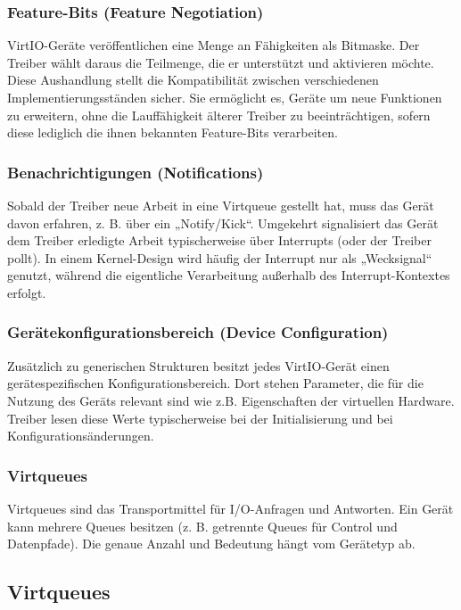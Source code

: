 \subsubsection{Feature-Bits (Feature Negotiation)}
VirtIO-Geräte veröffentlichen eine Menge an Fähigkeiten als Bitmaske. Der Treiber wählt daraus die Teilmenge, die er unterstützt und aktivieren möchte. Diese Aushandlung stellt die Kompatibilität zwischen verschiedenen Implementierungsständen sicher. Sie ermöglicht es, Geräte um neue Funktionen zu erweitern, ohne die Lauffähigkeit älterer Treiber zu beeinträchtigen, sofern diese lediglich die ihnen bekannten Feature-Bits verarbeiten.

\subsubsection{Benachrichtigungen (Notifications)}
Sobald der Treiber neue Arbeit in eine Virtqueue gestellt hat, muss das Gerät davon erfahren, z. B. über ein „Notify/Kick“. Umgekehrt signalisiert das Gerät dem Treiber erledigte Arbeit typischerweise über Interrupts (oder der Treiber pollt). In einem Kernel-Design wird häufig der Interrupt nur als „Wecksignal“ genutzt, während die eigentliche Verarbeitung außerhalb des Interrupt-Kontextes erfolgt.

\subsubsection{Gerätekonfigurationsbereich (Device Configuration)}
Zusätzlich zu generischen Strukturen besitzt jedes VirtIO-Gerät einen gerätespezifischen Konfigurationsbereich. Dort stehen Parameter, die für die Nutzung des Geräts relevant sind wie z.B. Eigenschaften der virtuellen Hardware. Treiber lesen diese Werte typischerweise bei der Initialisierung und bei Konfigurationsänderungen.

\subsubsection{Virtqueues}
Virtqueues sind das Transportmittel für I/O-Anfragen und Antworten. Ein Gerät kann mehrere Queues besitzen (z. B. getrennte Queues für Control und Datenpfade). Die genaue Anzahl und Bedeutung hängt vom Gerätetyp ab.

\subsection{Virtqueues}

